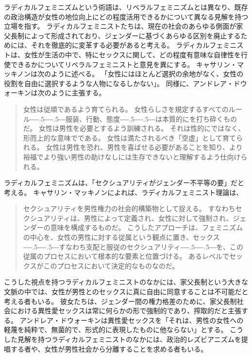 \documentclass[paper=a4,book,openany]{jlreq}
\newcommand{\ig}[1]{}           %
\def\DDASH{―\kern-.5\zw―\kern-.5\zw―}
\begin{document}
ラディカルフェミニズムという術語は、リベラルフェミニズムとは異なり、既存の政治構造が女性の地位向上にどの程度活用できるかについて異なる見解を持つ立場を指す。
ラディカルフェミニストたちは、現在の社会のあらゆる側面が家父長制によって形成されており、ジェンダーに基づくあらゆる区別を廃止するためには、それを徹底的に変革する必要があると考える。
ラディカルフェミニストは、女性が生活の中で、特にセックスに関して、どの程度有意味な自律性を行使できるかについてリベラルフェミニストと意見を異にする。
キャサリン・マッキノンは次のように述べる。
「女性にはほとんど選択の余地がなく、女性の役割を自由に選択するような人物になるしかない」\citep[p.124]{mackinnon89:_towar_femin_theor_of_state}。
同様に、アンドレア・ドウォーキンは次のように主張する。
\ig{Andrea Dworkin}

\begin{quote}
  女性は従順であるよう育てられる。
女性らしさを規定するすべてのルール{\DDASH}服装、行動、態度{\DDASH}は本質的にを打ち砕くものだ。
女性は男性を必要とするよう訓練される。
それは性的にではなく、形而上的な意味でである。
女性は満たされるべき「空虚」として育てられる。
女性は男性を恐れ、男性を喜ばせる必要があることを知り、より裕福でより強い男性の助けなしには生存できないと理解するよう仕向けられる。
\citep[p.81]{dworkin83:_righ_wing_women}
\end{quote}

ラディカルフェミニズムは、「セクシュアリティがジェンダー不平等の要」だと考える。
キャサリン・マッキノンによれば、ラディカルフェミニスト理論は、
\begin{quote}
セクシュアリティを男性権力の社会的構築物として捉える。
すなわちセクシュアリティは、男性によって定義され、女性に対して強制され、ジェンダーの意味を構成するものだ。
こうしたアプローチは、フェミニズムの中心を、女性の男性に対する従属という観点に置き、セックス{\DDASH}すなわち支配と服従のセクシュアリティ{\DDASH}を、この従属のプロセスにおいて根本的な要素と位置づける。
あるレベルでセックスがこのプロセスにおいて決定的なものなのだ。
\citep[p.128]{mackinnon89:_towar_femin_theor_of_state}
\end{quote}

こうした視点を持つラディカルフェミニストのなかには、家父長制という大きな文脈の中では、女性が男性とのセックスに真に自由に同意することは不可能だと考える者もいる。
彼女たちは、ジェンダー間の権力格差のために、家父長制社会における異性愛セックスは常に何らかの形で強制的であり、搾取的だと主張する。
アンドレア・ドウォーキンは異性愛セックスを「それは、男性の女性への軽蔑を純粋で、無菌的で、形式的に表現したものに他ならない」とする\citep[p.138]{dworkin87:_inter}。
\ig{Andrea Dworkin}こうした見解を持つラディカルフェミニストのなかには、政治的レズビアニズムを提唱する者や、女性が男性社会から分離することを求める者もいる。
\end{document}
